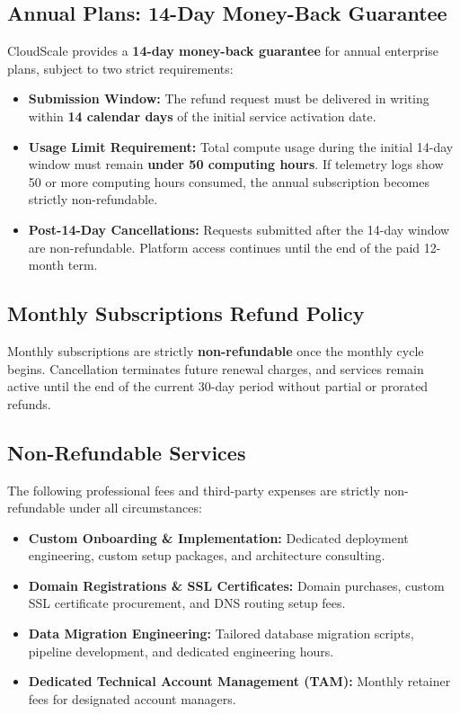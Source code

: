 \documentclass[10pt,letterpaper]{article}
\begin{document}
\subsection{Annual Plans: 14-Day Money-Back Guarantee}
CloudScale provides a \textbf{14-day money-back guarantee} for annual enterprise plans, subject to two strict requirements:
\begin{itemize}
  \item \textbf{Submission Window:} The refund request must be delivered in writing within \textbf{14 calendar days} of the initial service activation date.
  \item \textbf{Usage Limit Requirement:} Total compute usage during the initial 14-day window must remain \textbf{under 50 computing hours}. If telemetry logs show 50 or more computing hours consumed, the annual subscription becomes strictly non-refundable.
  \item \textbf{Post-14-Day Cancellations:} Requests submitted after the 14-day window are non-refundable. Platform access continues until the end of the paid 12-month term.
\end{itemize}

\subsection{Monthly Subscriptions Refund Policy}
Monthly subscriptions are strictly \textbf{non-refundable} once the monthly cycle begins. Cancellation terminates future renewal charges, and services remain active until the end of the current 30-day period without partial or prorated refunds.

\subsection{Non-Refundable Services}
The following professional fees and third-party expenses are strictly non-refundable under all circumstances:
\begin{itemize}
  \item \textbf{Custom Onboarding \& Implementation:} Dedicated deployment engineering, custom setup packages, and architecture consulting.
  \item \textbf{Domain Registrations \& SSL Certificates:} Domain purchases, custom SSL certificate procurement, and DNS routing setup fees.
  \item \textbf{Data Migration Engineering:} Tailored database migration scripts, pipeline development, and dedicated engineering hours.
  \item \textbf{Dedicated Technical Account Management (TAM):} Monthly retainer fees for designated account managers.
\end{itemize}
\end{document}
